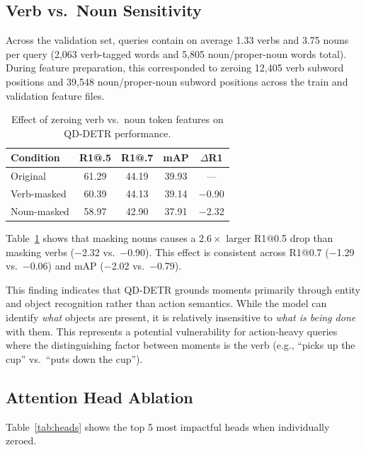 \documentclass[10pt,twocolumn]{article}
\begin{document}
\subsection{Verb vs.\ Noun Sensitivity}
\label{sec:vn_results}

Across the validation set, queries contain on average 1.33 verbs and 3.75 nouns per query (2,063 verb-tagged words and 5,805 noun/proper-noun words total). During feature preparation, this corresponded to zeroing 12,405 verb subword positions and 39,548 noun/proper-noun subword positions across the train and validation feature files.

\begin{table}[t]
\centering
\caption{Effect of zeroing verb vs.\ noun token features on QD-DETR performance.}
\label{tab:vn}
\small
\begin{tabular}{@{}lcccc@{}}
\toprule
\textbf{Condition} & \textbf{R1@.5} & \textbf{R1@.7} & \textbf{mAP} & \textbf{$\Delta$R1} \\
\midrule
Original    & 61.29 & 44.19 & 39.93 & ---  \\
Verb-masked & 60.39 & 44.13 & 39.14 & $-$0.90 \\
Noun-masked & 58.97 & 42.90 & 37.91 & $-$2.32 \\
\bottomrule
\end{tabular}
\vspace{-6pt}
\end{table}

Table~\ref{tab:vn} shows that masking nouns causes a $2.6\times$ larger R1@0.5 drop than masking verbs ($-$2.32 vs.\ $-$0.90). This effect is consistent across R1@0.7 ($-$1.29 vs.\ $-$0.06) and mAP ($-$2.02 vs.\ $-$0.79).

This finding indicates that QD-DETR grounds moments primarily through entity and object recognition rather than action semantics. While the model can identify \emph{what} objects are present, it is relatively insensitive to \emph{what is being done} with them. This represents a potential vulnerability for action-heavy queries where the distinguishing factor between moments is the verb (e.g., ``picks up the cup'' vs.\ ``puts down the cup'').

\subsection{Attention Head Ablation}
\label{sec:head_results}

Table~\ref{tab:heads} shows the top 5 most impactful heads when individually zeroed.
\end{document}
